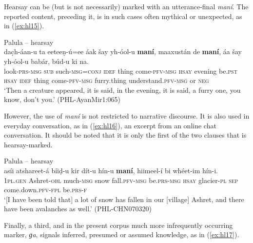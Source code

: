 \documentclass[output=paper]{langsci/langscibook}
\begin{document}
Hearsay can be (but is not necessarily) marked with an utterance-final \textit{maní}. The reported content, preceding it, is in such cases often mythical or unexpected, as in ‎(\ref{ex:hl15}).

\begin{exe}
	\ex Palula -- hearsay \label{ex:hl15}\\
	\gll dac̣h-áan-u ta eeteeṇ-ú=ee áak šay yh-óol-u \textbf{maní}, maaxustán de \textbf{maní}, áa šay yh-óol-u babár, búd-u ki na.\\
	look-\textsc{prs}-\textsc{msg} \textsc{sub} such-\textsc{msg}=\textsc{conj} \textsc{idef} thing come-\textsc{pfv}-\textsc{msg} \textsc{hsay} evening be.\textsc{pst} \textsc{hsay} \textsc{idef} thing come-\textsc{pfv}-\textsc{msg} furry.thing understand.\textsc{pfv}-\textsc{msg} or \textsc{neg}\\
	\trans ‘Then a creature appeared, it is said, in the evening, it is said, a furry one, you know, don’t you.’ (PHL-AyanMir1:065)
\end{exe}

However, the use of \textit{maní} is not restricted to narrative discourse. It is also used in everyday conversation, as in ‎(\ref{ex:hl16}), an excerpt from an online chat conversation. It should be noted that it is only the first of the two clauses that is hearsay-marked.

\begin{exe}
	\ex Palula -- hearsay \label{ex:hl16}\\
	\gll asíi atshareet-á bíiḍ-u kir dít-u hín-u \textbf{maní}, hiimeel-í bi whéet-im hín-i.\\
	1\textsc{pl}.\textsc{gen} Ashret-\textsc{obl} much-\textsc{msg} snow fall.\textsc{pfv}-\textsc{msg} be.\textsc{prs}-\textsc{msg} \textsc{hsay} glacier-\textsc{pl} \textsc{sep} come.down.\textsc{pfv}-\textsc{fpl} be.\textsc{prs}-\textsc{f}\\
	\trans ‘[I have been told that] a lot of snow has fallen in our [village] Ashret, and there have been avalanches as well.’ (PHL-CHN070320)
\end{exe}

Finally, a third, and in the present corpus much more infrequently occurring marker, \textit{ɡa}, signals inferred, presumed or assumed knowledge, as in ‎(\ref{ex:hl17}).
\end{document}
